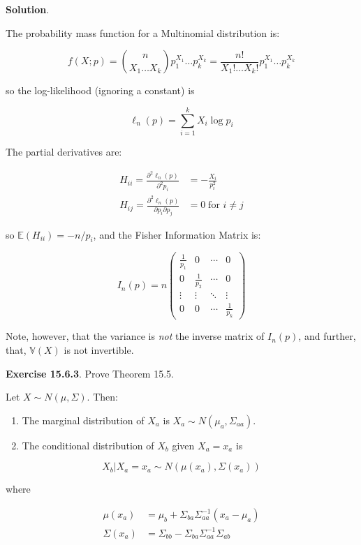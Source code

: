 \textbf{Solution}.

The probability mass function for a Multinomial distribution is:

\[ f(X; p) = \binom{n}{X_{1} \dots X_{k}} p_{1}^{X_{1}} \dots p_{k}^{X_{k}} = \frac{n!}{X_{1}! \dots X_{k}!} p_{1}^{X_{1}} \dots p_{k}^{X_{k}}\]

so the log-likelihood (ignoring a constant) is

\[ \ell_{n}(p) = \sum_{i=1}^{k} X_{i} \log p_{i}\]

The partial derivatives are:

\begin{align*}
H_{ii} = \frac{\partial^{2} \ell_{n}(p)}{\partial^{2} p_{i}} &= -\frac{X_{i}}{p_{i}^{2}} \\
H_{ij} = \frac{\partial^{2} \ell_{n}(p)}{\partial p_{i} \partial p_{j}} &= 0 \; \text{for } i \neq j
\end{align*}

so \(\mathbb{E}(H_{ii}) = - n/p_{i}\), and the Fisher Information Matrix
is:

\[I_{n}(p) = n \begin{pmatrix}
\frac{1}{p_{1}} & 0 & \cdots & 0 \\
0 & \frac{1}{p_{2}} & \cdots & 0 \\
\vdots & \vdots & \ddots & \vdots \\
0 & 0 & \cdots & \frac{1}{p_{k}}
\end{pmatrix}\]

Note, however, that the variance is \emph{not} the inverse matrix of
\(I_{n}(p)\), and further, that, \(\mathbb{V}(X)\) is not invertible.

\textbf{Exercise 15.6.3}. Prove Theorem 15.5.

Let \(X \sim N(\mu, \Sigma)\). Then:

\begin{enumerate}[tightlist,label={\arabic*.}]
\item
  The marginal distribution of \(X_a\) is
  \(X_a \sim N(\mu_a, \Sigma_{aa})\).
\item
  The conditional distribution of \(X_b\) given \(X_a = x_a\) is
\end{enumerate}

\[ X_b | X_a = x_a \sim N(\mu(x_a), \Sigma(x_a))\]

where

\begin{align*}
\mu(x_a) &= \mu_b + \Sigma_{ba} \Sigma_{aa}^{-1} (x_a - \mu_a) \\
\Sigma(x_a) &= \Sigma_{bb} - \Sigma_{ba}\Sigma_{aa}^{-1}\Sigma_{ab}
\end{align*}

